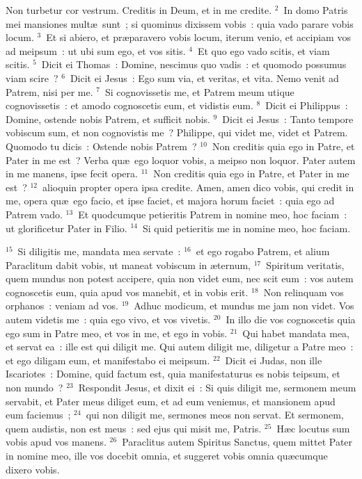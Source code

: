 \lettrine[lines=3,image=true,loversize=0.05,lraise=-0.03]{N}{}on turbetur cor vestrum. Creditis in Deum, et in me credite.
${}^{2}$~In domo Patris mei mansiones mult\ae\ sunt~; si quominus dixissem vobis~: quia vado parare vobis locum.
${}^{3}$~Et si abiero, et pr\ae paravero vobis locum, iterum venio, et accipiam vos ad meipsum~: ut ubi sum ego, et vos sitis.
${}^{4}$~Et quo ego vado scitis, et viam scitis.
${}^{5}$~Dicit ei Thomas~: Domine, nescimus quo vadis~: et quomodo possumus viam scire~?
${}^{6}$~Dicit ei Jesus~: Ego sum via, et veritas, et vita. Nemo venit ad Patrem, nisi per me.
${}^{7}$~Si cognovissetis me, et Patrem meum utique cognovissetis~: et amodo cognoscetis eum, et vidistis eum.
${}^{8}$~Dicit ei Philippus~: Domine, ostende nobis Patrem, et sufficit nobis.
${}^{9}$~Dicit ei Jesus~: Tanto tempore vobiscum sum, et non cognovistis me~? Philippe, qui videt me, videt et Patrem. Quomodo tu dicis~: Ostende nobis Patrem~?
${}^{10}$~Non creditis quia ego in Patre, et Pater in me est~? Verba qu\ae\ ego loquor vobis, a meipso non loquor. Pater autem in me manens, ipse fecit opera.
${}^{11}$~Non creditis quia ego in Patre, et Pater in me est~?
${}^{12}$~alioquin propter opera ipsa credite. Amen, amen dico vobis, qui credit in me, opera qu\ae\ ego facio, et ipse faciet, et majora horum faciet~: quia ego ad Patrem vado.
${}^{13}$~Et quodcumque petieritis Patrem in nomine meo, hoc faciam~: ut glorificetur Pater in Filio.
${}^{14}$~Si quid petieritis me in nomine meo, hoc faciam.


${}^{15}$~Si diligitis me, mandata mea servate~:
${}^{16}$~et ego rogabo Patrem, et alium Paraclitum dabit vobis, ut maneat vobiscum in \ae ternum,
${}^{17}$~Spiritum veritatis, quem mundus non potest accipere, quia non videt eum, nec scit eum~: vos autem cognoscetis eum, quia apud vos manebit, et in vobis erit.
${}^{18}$~Non relinquam vos orphanos~: veniam ad vos.
${}^{19}$~Adhuc modicum, et mundus me jam non videt. Vos autem videtis me~: quia ego vivo, et vos vivetis.
${}^{20}$~In illo die vos cognoscetis quia ego sum in Patre meo, et vos in me, et ego in vobis.
${}^{21}$~Qui habet mandata mea, et servat ea~: ille est qui diligit me. Qui autem diligit me, diligetur a Patre meo~: et ego diligam eum, et manifestabo ei meipsum.
${}^{22}$~Dicit ei Judas, non ille Iscariotes~: Domine, quid factum est, quia manifestaturus es nobis teipsum, et non mundo~?
${}^{23}$~Respondit Jesus, et dixit ei~: Si quis diligit me, sermonem meum servabit, et Pater meus diliget eum, et ad eum veniemus, et mansionem apud eum faciemus~;
${}^{24}$~qui non diligit me, sermones meos non servat. Et sermonem, quem audistis, non est meus~: sed ejus qui misit me, Patris.
${}^{25}$~H\ae c locutus sum vobis apud vos manens.
${}^{26}$~Paraclitus autem Spiritus Sanctus, quem mittet Pater in nomine meo, ille vos docebit omnia, et suggeret vobis omnia qu\ae cumque dixero vobis.


